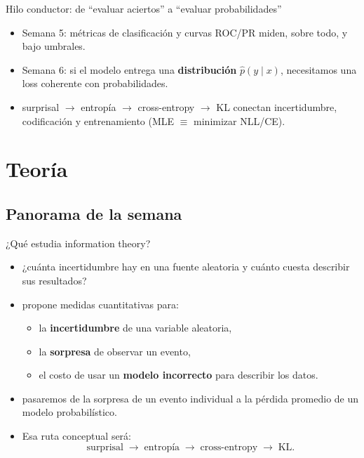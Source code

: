 \begin{frame}{Hilo conductor: de “evaluar aciertos” a “evaluar probabilidades”}
\begin{itemize}
  \item Semana 5: métricas de clasificación y curvas ROC/PR miden, sobre todo,  y  bajo umbrales.
  \item Semana 6: si el modelo entrega una \textbf{distribución} \(\hat p(y\mid x)\), necesitamos una loss coherente con probabilidades.
  \item {} surprisal \(\rightarrow\) entropía \(\rightarrow\) cross-entropy \(\rightarrow\) KL conectan incertidumbre, codificación y entrenamiento (MLE \(\equiv\) minimizar NLL/CE).
\end{itemize}
\end{frame}

\section[Teoría]{Teoría\label{sec:teoria-w06}}

\subsection[Panorama]{Panorama de la semana}

\begin{frame}{¿Qué estudia information theory?}
\begin{itemize}
  \item {} ¿cuánta incertidumbre hay en una fuente aleatoria y cuánto cuesta describir sus resultados?
  \item {} propone medidas cuantitativas para:
  \begin{itemize}
    \item la \textbf{incertidumbre} de una variable aleatoria,
    \item la \textbf{sorpresa} de observar un evento,
    \item el costo de usar un \textbf{modelo incorrecto} para describir los datos.
  \end{itemize}
  \item {} pasaremos de la sorpresa de un evento individual a la pérdida promedio de un modelo probabilístico.
  \item Esa ruta conceptual será:
  \[
    \text{surprisal} \;\longrightarrow\; \text{entropía} \;\longrightarrow\; \text{cross-entropy} \;\longrightarrow\; \mathrm{KL}.
  \]
\end{itemize}
\end{frame}

